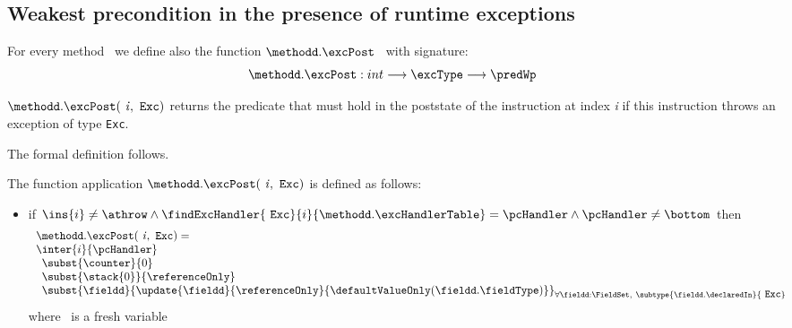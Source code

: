 

\subsection{Weakest precondition in the presence of runtime exceptions}\label{wp:interExc} 

For every method \methodd \  we define also the function $ \methodd.\excPost $ \ with signature:
$$\methodd.\excPost : int   \longrightarrow \excType \longrightarrow  \predWp  $$
 
$ \methodd.\excPost(\mbox{ \rm \textit{i}},  \mbox{ \rm \texttt{Exc}})$ 
returns the predicate that must hold in the poststate of the instruction at index \textit{i} if this instruction throws an exception of
type \texttt{Exc}.

The formal definition follows.
\begin{defExc}\label{defExc}
The function application $\methodd.\excPost( \mbox{ \rm \textit{i}} ,  \mbox{ \rm \texttt{Exc}} )   $ is defined as follows:
 \begin{itemize}
    \item if $  \ins{i} \neq \athrow \wedge  \findExcHandler{\mbox{ \rm \texttt{Exc}} }{i}{\methodd.\excHandlerTable} = \pcHandler \wedge \pcHandler \neq \bottom    $ then 
      $$ \begin{array}{l}
           \methodd.\excPost( \mbox{ \rm \textit{i}} ,  \mbox{ \rm \texttt{Exc}}) = \\
           \inter{i}{\pcHandler}\\
                      \begin{array}{l}
                        \subst{\counter}{0} \\
			\subst{\stack{0}}{\referenceOnly} \\
                         \subst{ \fieldd} { \update{\fieldd} { \referenceOnly }{\defaultValueOnly( \fieldd.  \fieldType ) } }_{{\small \forall \fieldd : \FieldSet, \ 
                         \subtype{\fieldd.\declaredIn}{ \mbox{ \rm \texttt{Exc}}} } } 
                       \end{array} 
        \end{array}$$   
	where  \ is a fresh variable

   



\end{itemize}
\end{defExc}
